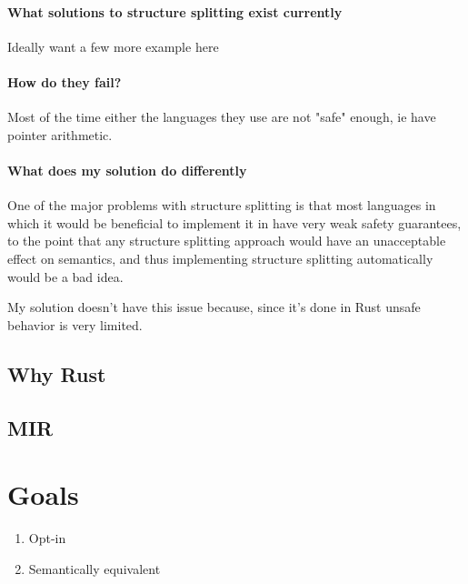 \documentclass[12pt,final]{article}
\begin{document}
\paragraph{What solutions to structure splitting exist currently}
Ideally want a few more example here

\paragraph{How do they fail?}
Most of the time either the languages they use are not "safe" enough, ie have pointer arithmetic. 

\paragraph{What does my solution do differently}

One of the major problems with
structure splitting is that most languages in which it would be beneficial to
implement it in have very weak safety guarantees, to the point that any
structure splitting approach would have an unacceptable effect on semantics, and
thus implementing structure splitting automatically would be a bad idea.

My solution doesn't have this issue because, since it's done in Rust unsafe behavior is very limited.

\subsection{Why Rust}

\subsection{MIR}

\section{Goals}
\label{sec:goal}

\begin{enumerate}
\item Opt-in
\item Semantically equivalent

\end{enumerate}
\end{document}
